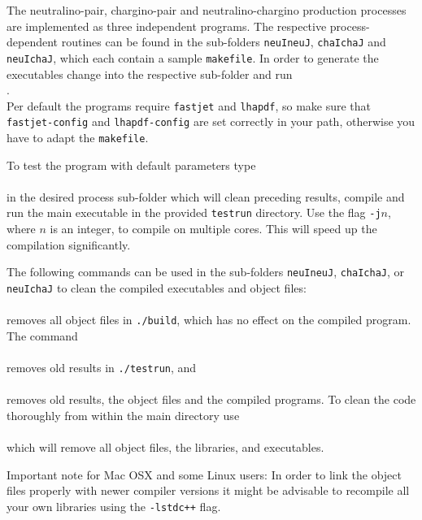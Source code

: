 \documentclass[a4paper,11pt]{article}
\begin{document}
The neutralino-pair, chargino-pair and neutralino-chargino production processes are implemented as three independent programs. The respective process-dependent routines can be found in the sub-folders {\tt neuIneuJ}, {\tt chaIchaJ} and {\tt neuIchaJ}, which each contain a sample {\tt makefile}. In order to generate the executables change into the respective sub-folder and run
\\[2ex]
\hspace*{2cm}{\tt \$ make -j4 all}.
\\[2ex]
Per default the programs require {\tt fastjet} and {\tt lhapdf}, so make sure that {\tt fastjet-config} and {\tt lhapdf-config} are set correctly in your path, otherwise you have to adapt the {\tt makefile}.

To test the program with default parameters type 
\\[2ex]
\hspace*{2cm}{\tt \$ make clean-results \&\& make -j4 do}
\\[2ex]
in the desired process sub-folder which will clean preceding results, compile and run the main executable in the provided {\tt testrun} directory.
Use the flag {\tt -j$n$}, where $n$ is an integer, to compile on multiple cores. This will speed up the compilation significantly.

The following commands can be used in the sub-folders {\tt neuIneuJ}, {\tt chaIchaJ}, or {\tt neuIchaJ} to clean the compiled executables and object files:
\\[2ex]
\hspace*{2cm}{\tt \$ make clean}
\\[2ex]
removes all object files in  {\tt ./build}, which has no effect on the compiled program. The command 
\\[2ex]
\hspace*{2cm}{\tt \$ make clean-results}
\\[2ex]
removes old results in {\tt ./testrun}, and 
\\[2ex]
\hspace*{2cm}{\tt \$ make clean-all}
\\[2ex]
removes old results, the object files and the compiled programs. To clean the code thoroughly from within the main directory use 
\\[2ex]
\hspace*{2cm}{\tt \$ make clean}
\\[2ex]
which will remove all object files, the libraries, and executables.

Important note for Mac OSX and some Linux users: In order to link the object files properly with newer compiler versions it might be advisable to recompile all your own libraries using the {\tt -lstdc++} flag.
\end{document}
